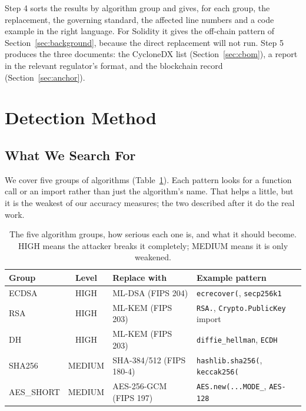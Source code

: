 \documentclass[runningheads]{llncs}
\begin{document}
Step 4 sorts the results by algorithm group and gives, for each group, the
replacement, the governing standard, the affected line numbers and a code
example in the right language. For Solidity it gives the off-chain pattern of
Section~\ref{sec:background}, because the direct replacement will not run. Step
5 produces the three documents: the CycloneDX list (Section~\ref{sec:cbom}), a
report in the relevant regulator's format, and the blockchain record
(Section~\ref{sec:anchor}).

\section{Detection Method}
\label{sec:method}

\subsection{What We Search For}
\label{sec:patterns}

We cover five groups of algorithms (Table~\ref{tab:families}). Each pattern
looks for a function call or an import rather than just the algorithm's name.
That helps a little, but it is the weakest of our accuracy measures; the two
described after it do the real work.

\begin{table}[t]
\centering
\caption{The five algorithm groups, how serious each one is, and what it should
become. HIGH means the attacker breaks it completely; MEDIUM means it is only
weakened.}
\label{tab:families}
\begin{tabular}{@{}lclp{32mm}@{}}
\toprule
\textbf{Group} & \textbf{Level} & \textbf{Replace with} & \textbf{Example pattern} \\
\midrule
ECDSA      & HIGH   & ML-DSA (FIPS 204)        & \texttt{ecrecover(}, \texttt{secp256k1} \\
RSA        & HIGH   & ML-KEM (FIPS 203)        & \texttt{RSA.}, \texttt{Crypto.PublicKey} import \\
DH         & HIGH   & ML-KEM (FIPS 203)        & \texttt{diffie\_hellman}, \texttt{ECDH} \\
SHA256     & MEDIUM & SHA-384/512 (FIPS 180-4) & \texttt{hashlib.sha256(}, \texttt{keccak256(} \\
AES\_SHORT & MEDIUM & AES-256-GCM (FIPS 197)   & \texttt{AES.new(...MODE\_}, \texttt{AES-128} \\
\bottomrule
\end{tabular}
\end{table}
\end{document}
